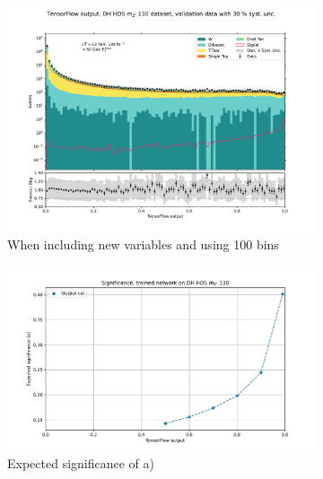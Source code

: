 \documentclass[14pt, a4paper]{book}
\begin{document}
\begin{figure}[!ht]
	\centering
	\begin{subfigure}[b]{0.49\textwidth}
      \centering
      \includegraphics[width=1\textwidth]{new_variables/finer_binning/VAL.pdf}
      \caption{When including new variables and using 100 bins}
   \end{subfigure}
   \hfill
   \begin{subfigure}[b]{0.49\textwidth}
      \centering
      \includegraphics[width=1\textwidth]{new_variables/finer_binning/EXP_SIG.pdf}
      \caption{Expected significance of a)}
   \end{subfigure}
   \hfill
   \begin{subfigure}[b]{0.49\textwidth}
      \centering

\end{subfigure}
\end{figure}
\end{document}

